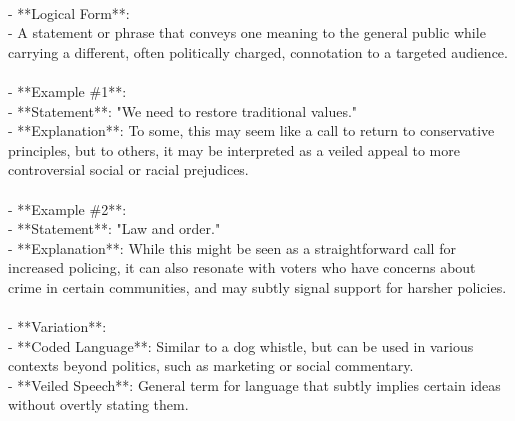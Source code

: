 \documentclass[a4paper,12pt,single,pdftex]{scrartcl}
\begin{document}
    
      
    \\

    
      - **Logical Form**:
    \\

    
        - A statement or phrase that conveys one meaning to the general public while carrying a different, often politically charged, connotation to a targeted audience.
    \\

    
      
    \\

    
      - **Example \#1**:
    \\

    
        - **Statement**: "We need to restore traditional values."
    \\

    
        - **Explanation**: To some, this may seem like a call to return to conservative principles, but to others, it may be interpreted as a veiled appeal to more controversial social or racial prejudices.
    \\

    
      
    \\

    
      - **Example \#2**:
    \\

    
        - **Statement**: "Law and order."
    \\

    
        - **Explanation**: While this might be seen as a straightforward call for increased policing, it can also resonate with voters who have concerns about crime in certain communities, and may subtly signal support for harsher policies.
    \\

    
      
    \\

    
      - **Variation**:
    \\

    
        - **Coded Language**: Similar to a dog whistle, but can be used in various contexts beyond politics, such as marketing or social commentary.
    \\

    
        - **Veiled Speech**: General term for language that subtly implies certain ideas without overtly stating them.
    \\
\end{document}
